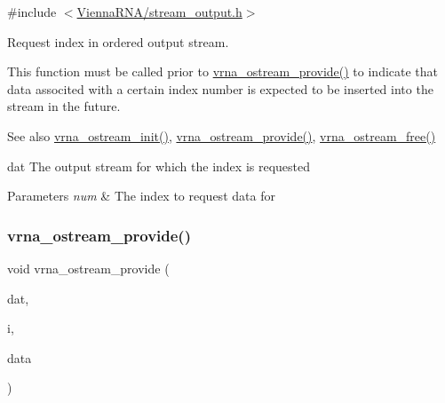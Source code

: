 {\ttfamily \#include $<$\mbox{\hyperlink{stream__output_8h}{Vienna\+R\+N\+A/stream\+\_\+output.\+h}}$>$}



Request index in ordered output stream. 

This function must be called prior to \mbox{\hyperlink{group__buffer__utils_ga6253c42abdeaf3b41a38204865e1f0f7}{vrna\+\_\+ostream\+\_\+provide()}} to indicate that data associted with a certain index number is expected to be inserted into the stream in the future.

\begin{DoxySeeAlso}{See also}
\mbox{\hyperlink{group__buffer__utils_gad23113e66a0910ec2341856e2da56bf6}{vrna\+\_\+ostream\+\_\+init()}}, \mbox{\hyperlink{group__buffer__utils_ga6253c42abdeaf3b41a38204865e1f0f7}{vrna\+\_\+ostream\+\_\+provide()}}, \mbox{\hyperlink{group__buffer__utils_gaf813ec90e1446ba82c89f9a39688a3b3}{vrna\+\_\+ostream\+\_\+free()}}
\end{DoxySeeAlso}
dat The output stream for which the index is requested 
\begin{DoxyParams}{Parameters}
{\em num} & The index to request data for \\
\hline
\end{DoxyParams}
\mbox{\label{group__buffer__utils_ga6253c42abdeaf3b41a38204865e1f0f7}} 
\subsubsection{\texorpdfstring{vrna\+\_\+ostream\+\_\+provide()}{vrna\_ostream\_provide()}}
{\footnotesize\ttfamily void vrna\+\_\+ostream\+\_\+provide (\begin{DoxyParamCaption}\item[{\mbox{\hyperlink{group__buffer__utils_ga8da189552af21ab6e4e88bdcc240870c}{vrna\+\_\+ostream\+\_\+t}}}]{dat,  }\item[{unsigned int}]{i,  }\item[{void $\ast$}]{data }\end{DoxyParamCaption})}



